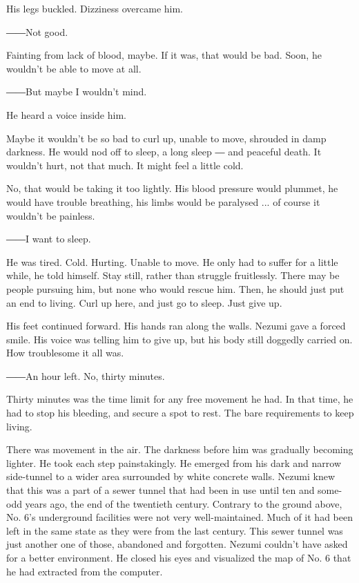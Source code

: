 His legs buckled. Dizziness overcame him.

――Not good.

Fainting from lack of blood, maybe. If it was, that would be bad. Soon,
he wouldn't be able to move at all.

――But maybe I wouldn't mind.

He heard a voice inside him.

Maybe it wouldn't be so bad to curl up, unable to move, shrouded in damp
darkness. He would nod off to sleep, a long sleep ― and peaceful death.
It wouldn't hurt, not that much. It might feel a little cold.

No, that would be taking it too lightly. His blood pressure would
plummet, he would have trouble breathing, his limbs would be paralysed
... of course it wouldn't be painless.

――I want to sleep.

He was tired. Cold. Hurting. Unable to move. He only had to suffer for a
little while, he told himself. Stay still, rather than struggle
fruitlessly. There may be people pursuing him, but none who would rescue
him. Then, he should just put an end to living. Curl up here, and just
go to sleep. Just give up.

His feet continued forward. His hands ran along the walls. Nezumi gave a
forced smile. His voice was telling him to give up, but his body still
doggedly carried on. How troublesome it all was.

――An hour left. No, thirty minutes.

Thirty minutes was the time limit for any free movement he had. In that
time, he had to stop his bleeding, and secure a spot to rest. The bare
requirements to keep living.

There was movement in the air. The darkness before him was gradually
becoming lighter. He took each step painstakingly. He emerged from his
dark and narrow side-tunnel to a wider area surrounded by white concrete
walls. Nezumi knew that this was a part of a sewer tunnel that had been
in use until ten and some-odd years ago, the end of the twentieth
century. Contrary to the ground above, No. 6's underground facilities
were not very well-maintained. Much of it had been left in the same
state as they were from the last century. This sewer tunnel was just
another one of those, abandoned and forgotten. Nezumi couldn't have
asked for a better environment. He closed his eyes and visualized the
map of No. 6 that he had extracted from the computer.

